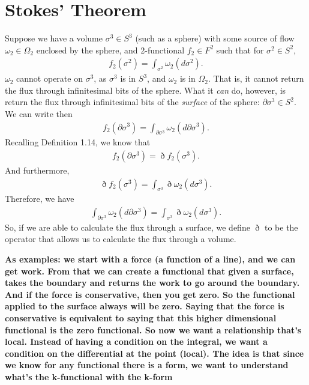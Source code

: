 \documentclass{book}
\begin{document}
\section{Stokes' Theorem}

Suppose we have a volume $\sigma^3 \in S^3$ (such as a sphere) with some source of flow $\omega_2 \in \Omega_2$ enclosed by the sphere, and 2-functional $f_2 \in F^2$ such that for $\sigma^2 \in S^2$, \begin{gather}f_2(\sigma^2) = \int_{\sigma^2} \omega_2(d\sigma^2).\end{gather} $\omega_2$ cannot operate on $\sigma^3$, as $\sigma^3$ is in $S^3$, and $\omega_2$ is in $\Omega_2$. That is, it cannot return the flux through infinitesimal bits of the sphere. What it \emph{can} do, however, is return the flux through infinitesimal bits of the \emph{surface} of the sphere: $\partial \sigma^3 \in S^2$. We can write then \begin{gather}f_2(\partial\sigma^3) = \int_{\partial\sigma^3} \omega_2 (d\partial\sigma^3).\end{gather} Recalling Definition 1.14, we know that \begin{gather}f_2(\partial\sigma^3) = \eth f_2(\sigma^3).\end{gather} And furthermore, \begin{gather}\eth f_2(\sigma^3) = \int_{\sigma^3} \eth\omega_2(d\sigma^3).\end{gather} Therefore, we have \begin{gather}\int_{\partial \sigma^3} \omega_2(d\partial\sigma^3) = \int_{\sigma^3} \eth \omega_2(d\sigma^3).\end{gather} So, if we are able to calculate the flux through a surface, we define $\eth$ to be the operator that allows us to calculate the flux through a volume. 

\textbf{As examples: we start with a force (a function of a line), and we can get work. From that we can create a functional that given a surface, takes the boundary and returns the work to go around the boundary. And if the force is conservative, then you get zero. So the functional applied to the surface always will be zero. Saying that the force is conservative is equivalent to saying that this higher dimensional functional is the zero functional. So now we want a relationship that's local. Instead of having a condition on the integral, we want a condition on the differential at the point (local). The idea is that since we know for any functional there is a form, we want to understand what's the k-functional with the k-form}
\end{document}
